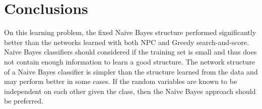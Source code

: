 \section{Conclusions}
\label{sec:conclusions}

On this learning problem, the fixed Naive Bayes structure performed significantly better than the networks learned with both NPC and Greedy search-and-score.
Naive Bayes classifiers should considered if the training set is small and thus does not contain enough information to learn a good structure.
The network structure of a Naive Bayes classifier is simpler than the structure learned from the data and may perform better in some cases.
If the random variables are known to be independent on each other given the class, then the Naive Bayes approach should be preferred.
